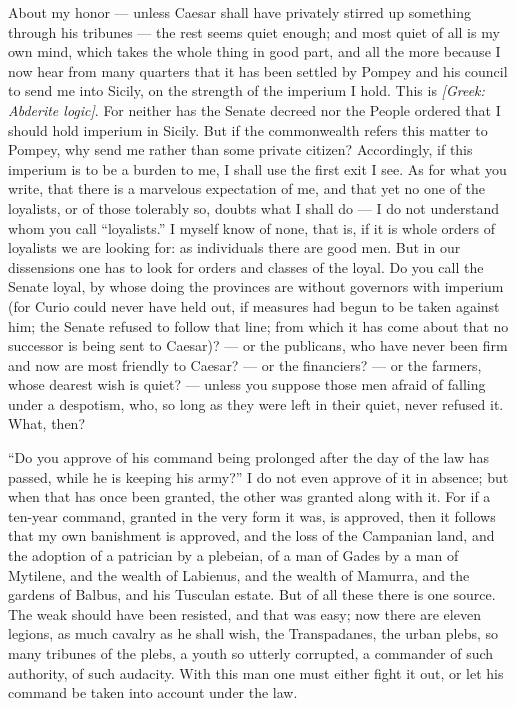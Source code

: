  About my honor --- unless Caesar shall have privately stirred up something through his tribunes --- the rest seems quiet enough; and most quiet of all is my own mind, which takes the whole thing in good part, and all the more because I now hear from many quarters that it has been settled by Pompey and his council to send me into Sicily, on the strength of the imperium I hold. This is \textit{[Greek: Abderite logic]}. For neither has the Senate decreed nor the People ordered that I should hold imperium in Sicily. But if the commonwealth refers this matter to Pompey, why send me rather than some private citizen? Accordingly, if this imperium is to be a burden to me, I shall use the first exit I see. As for what you write, that there is a marvelous expectation of me, and that yet no one of the loyalists, or of those tolerably so, doubts what I shall do --- I do not understand whom you call ``loyalists.'' I myself know of none, that is, if it is whole orders of loyalists we are looking for: as individuals there are good men. But in our dissensions one has to look for orders and classes of the loyal. Do you call the Senate loyal, by whose doing the provinces are without governors with imperium (for Curio could never have held out, if measures had begun to be taken against him; the Senate refused to follow that line; from which it has come about that no successor is being sent to Caesar)? --- or the publicans, who have never been firm and now are most friendly to Caesar? --- or the financiers? --- or the farmers, whose dearest wish is quiet? --- unless you suppose those men afraid of falling under a despotism, who, so long as they were left in their quiet, never refused it. What, then?

 ``Do you approve of his command being prolonged after the day of the law has passed, while he is keeping his army?'' I do not even approve of it in absence; but when that has once been granted, the other was granted along with it. For if a ten-year command, granted in the very form it was, is approved, then it follows that my own banishment is approved, and the loss of the Campanian land, and the adoption of a patrician by a plebeian, of a man of Gades by a man of Mytilene, and the wealth of Labienus, and the wealth of Mamurra, and the gardens of Balbus, and his Tusculan estate. But of all these there is one source. The weak should have been resisted, and that was easy; now there are eleven legions, as much cavalry as he shall wish, the Transpadanes, the urban plebs, so many tribunes of the plebs, a youth so utterly corrupted, a commander of such authority, of such audacity. With this man one must either fight it out, or let his command be taken into account under the law.

